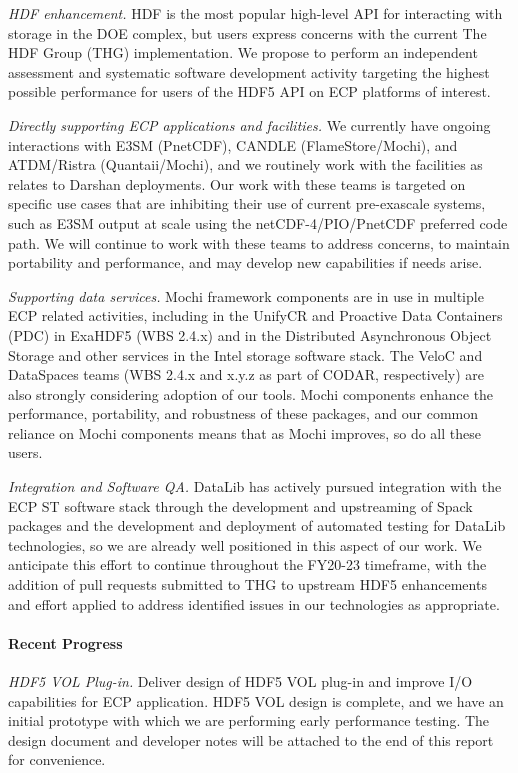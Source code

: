 \emph{HDF enhancement.} HDF is the most popular high-level API for
interacting with storage in the DOE complex, but users express concerns
with the current The HDF Group (THG) implementation. We propose to perform
an independent assessment and systematic software development activity
targeting the highest possible performance for users of the HDF5 API on
ECP platforms of interest.

\emph{Directly supporting ECP applications and facilities.} We currently
have ongoing interactions with E3SM (PnetCDF), CANDLE (FlameStore/Mochi),
and ATDM/Ristra (Quantaii/Mochi), and we routinely work with the
facilities as relates to Darshan deployments. Our work with these
teams is targeted on specific use cases that are inhibiting their use
of current pre-exascale systems, such as E3SM output at scale using the
netCDF-4/PIO/PnetCDF preferred code path. We will continue to work with
these teams to address concerns, to maintain portability and performance,
and may develop new capabilities if needs arise. 

\emph{Supporting data services.} Mochi framework components are in use in
multiple ECP related activities, including in the UnifyCR and Proactive
Data Containers (PDC) in ExaHDF5 (WBS 2.4.x) and in the Distributed
Asynchronous Object Storage and other services in the Intel storage
software stack. The VeloC and DataSpaces teams (WBS 2.4.x and x.y.z as
part of CODAR, respectively) are also strongly considering adoption
of our tools. Mochi components enhance the performance, portability,
and robustness of these packages, and our common reliance on Mochi
components means that as Mochi improves, so do all these users.

\emph{Integration and Software QA.} DataLib has actively pursued
integration with the ECP ST software stack through the development
and upstreaming of Spack packages and the development and deployment
of automated testing for DataLib technologies, so we are already well
positioned in this aspect of our work. We anticipate this effort to
continue throughout the FY20-23 timeframe, with the addition of pull
requests submitted to THG to upstream HDF5 enhancements and effort applied
to address identified issues in our technologies as appropriate.

\paragraph{Recent Progress}

\emph{HDF5 VOL Plug-in.} Deliver design of HDF5 VOL plug-in and improve I/O
capabilities for ECP application. HDF5 VOL design is complete, and we have an
initial prototype with which we are performing early performance testing. The
design document and developer notes will be attached to the end of this report
for convenience.

